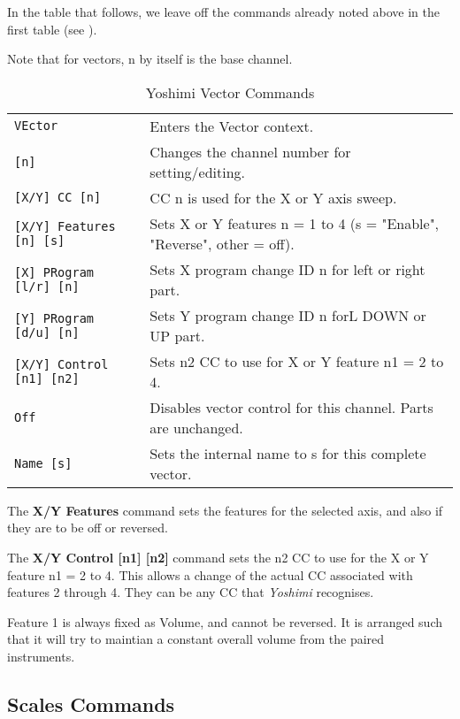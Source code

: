    In the table that follows, we leave off the commands already noted
   above in the first table
   (see ).

   Note that for vectors, n by itself is the base channel.

   \begin{table}[H]
      \centering
      \caption{Yoshimi Vector Commands}
      \label{table:yoshimi_text_vector_commands}
      \begin{tabular}{l l}

\texttt{VEctor} &
   Enters the Vector context. \\
   \texttt{[n]} &
   Changes the channel number for setting/editing.\\
\texttt{[X/Y] CC [n]} &
   CC n is used for the X or Y axis sweep. \\
\texttt{[X/Y] Features [n] [s]} &
   Sets X or Y features n = 1 to 4 (s = "Enable", "Reverse", other = off).  \\
\texttt{[X] PRogram [l/r] [n]} &
   Sets X program change ID n for left or right part. \\
\texttt{[Y] PRogram [d/u] [n]} &
   Sets Y program change ID n forL DOWN or UP part. \\
\texttt{[X/Y] Control [n1] [n2]} &
   Sets n2 CC to use for X or Y feature n1 = 2 to 4. \\
\texttt{Off} &
   Disables vector control for this channel.  Parts are unchanged. \\
\texttt{Name [s]} &
   Sets the internal name to s for this complete vector.  \\

      \end{tabular}
   \end{table}

   The \textbf{X/Y Features} command sets the features for the
   selected axis, and also if they are to be off or reversed.

   The \textbf{X/Y Control [n1] [n2]} command
   sets the n2 CC to use for the X or Y feature n1 = 2 to 4.
   This allows a change of the actual CC associated with features 2 through 4.
   They can be any CC that \textsl{Yoshimi} recognises.

   Feature 1 is always fixed as Volume, and cannot be reversed. It is arranged
   such that it will try to maintian a constant overall volume from the paired
   instruments.

\subsection{Scales Commands}
\label{subsec:command_line_scales_command_list}

